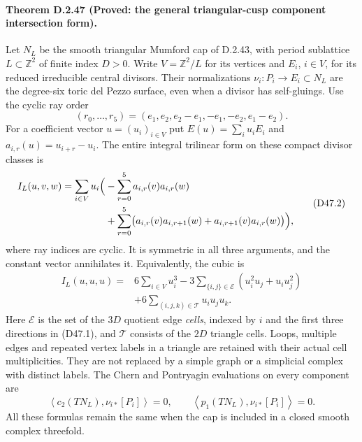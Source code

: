\paragraph{Theorem D.2.47 (Proved: the general triangular-cusp component intersection form).}
Let $N_L$ be the smooth triangular Mumford cap of D.2.43,
with period sublattice $L\subset\mathbb Z^2$ of finite index
$D>0$. Write $V=\mathbb Z^2/L$ for its vertices and
$E_i$, $i\in V$, for its reduced irreducible central divisors.
Their normalizations $\nu_i:P_i\to E_i\subset N_L$ are the
degree-six toric del Pezzo surface, even when a divisor has
self-gluings. Use the cyclic ray order
\[
 (r_0,\ldots,r_5)=
       (e_1,e_2,e_2-e_1,-e_1,-e_2,e_1-e_2).                 \tag{D47.1}
\]
For a coefficient vector $u=(u_i)_{i\in V}$ put
$E(u)=\sum_i u_iE_i$ and
$a_{i,r}(u)=u_{i+r}-u_i$. The entire integral trilinear
form on these compact divisor classes is
\[
\begin{split}
 I_L(u,v,w)=\sum_{i\in V}u_i\Bigl(
 &-\sum_{r=0}^5 a_{i,r}(v)a_{i,r}(w)\\
 &+\sum_{r=0}^5\bigl(a_{i,r}(v)a_{i,r+1}(w)
                    +a_{i,r+1}(v)a_{i,r}(w)\bigr)\Bigr),
\end{split}                                                   \tag{D47.2}
\]
where ray indices are cyclic. It is symmetric in all three
arguments, and the constant vector annihilates it.
Equivalently, the cubic is
\[
\begin{split}
 I_L(u,u,u)={}&6\sum_{i\in V}u_i^3
       -3\sum_{\{i,j\}\in\mathcal E}
                      (u_i^2u_j+u_iu_j^2)\\
       &+6\sum_{(i,j,k)\in\mathcal T}u_iu_ju_k.
\end{split}                                                   \tag{D47.3}
\]
Here $\mathcal E$ is the set of the $3D$ quotient edge
\emph{cells}, indexed by $i$ and the first three directions
in (D47.1), and $\mathcal T$ consists of the $2D$ triangle
cells. Loops, multiple edges and repeated vertex labels in
a triangle are retained with their actual cell multiplicities.
They are not replaced by a simple graph or a simplicial
complex with distinct labels.
The Chern and Pontryagin evaluations on every component are
\[
 \left\langle c_2(TN_L),\nu_{i*}[P_i]\right\rangle=0,
 \qquad
 \left\langle p_1(TN_L),\nu_{i*}[P_i]\right\rangle=0.         \tag{D47.4}
\]
All these formulas remain the same when the cap is included
in a closed smooth complex threefold.

